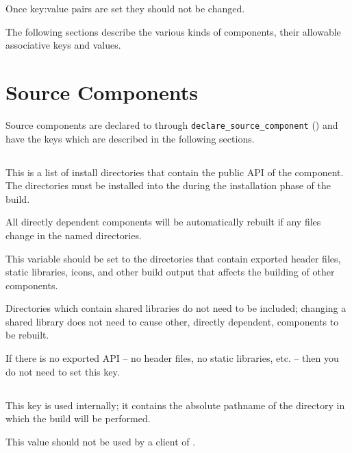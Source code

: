 Once key:value pairs are set they should not be changed.

The following sections describe the various kinds of components, their
allowable associative keys and values.

\section{Source Components}

Source components are declared to \lmsbw through
\texttt{declare\_source\_component}
() and have the keys which are
described in the following sections.

\subsection{}\label{variables:api}

This is a list of install directories that contain the public API of
the component.  The directories must be installed into the \destdir
during the installation phase of the build.

All directly dependent components will be automatically rebuilt if any
files change in the named directories.

This variable should be set to the directories that contain exported
header files, static libraries, icons, and other build output that
affects the building of other components.

Directories which contain shared libraries do not need to be included;
changing a shared library does not need to cause other, directly
dependent, components to be rebuilt.

If there is no exported API -- no header files, no static libraries,
etc. -- then you do not need to set this key.


\subsection{}\label{variables:build-directory}

This key is used internally; it contains the absolute pathname of the
directory in which the build will be performed.

This value should not be used by a client of \lmsbw.


